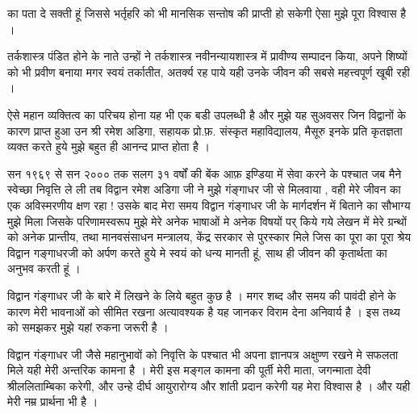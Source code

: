 का पता दे सक्ती हूं जिससे भर्तृहरि को भी मानसिक सन्तोष की प्राप्ती हो सकेगी ऐसा मुझे पूरा विश्वास है । 

तर्कशास्त्र पंडित होने के नाते उन्हों ने तर्कशास्त्र नवीनन्यायशास्त्र में प्रावीण्य सम्पादन किया, अपने शिष्यों को भी प्रवीण बनाया मगर स्वयं तर्कातीत, अतर्क्य रह पाये यही उनके जीवन की सबसे महत्त्वपूर्ण खूबी रही । 

ऐसे महान व्यक्तित्व का परिचय होना यह भी एक बडी उपलब्धी है और मुझे यह सुअवसर जिन विद्वानों के कारण प्राप्त हुआ उन श्री रमेश अडिगा, सहायक प्रो.फ़. संस्कृत महाविद्यालय, मैसूरु इनके प्रति कृतज्ञता व्यक्त करते हुये मुझे बहुत ही आनन्द प्राप्त होता है । 

सन १९६९ से सन २००० तक सलग ३१ वर्षों की बेंक आफ़ इण्डिया में सेवा करने के पश्चात जब मैने स्वेच्छा निवृत्ति ले ली तब विद्वान रमेश अडिगा जी ने मुझे गंङ्गाधर जी से मिलवाया , वही मेरे जीवन का एक अविस्मरणीय क्षण रहा ! उसके बाद मेरा समय विद्वान गंङ्गाधर जी के मार्गदर्शन में बिताने का सौभाग्य मुझे मिला जिसके परिणामस्वरूप मुझे मेरे अनेक भाषाओं मे अनेक विषयों पर् किये गये लेखन में मेरे ग्रन्थों को अनेक प्रान्तीय, तथा मानवसंसाधन मन्त्रालय, केंद्र सरकार से पुरस्कार मिले जिस का पूरा का पूरा श्रेय विद्वान गङ्गाधरजी को अर्पण करते हुये मे स्वयं को धन्य मानती हूं, साथ ही जीवन की कृतार्थता का   अनुभव करती हूं ।

विद्वान गंङ्गाधर जी के बारे में लिखने के लिये बहुत कुछ है ।  मगर शब्द और समय की पावंदी होने के कारण मेरी भावनाओं को सीमित रखना अत्यावश्यक है यह जानकर विराम देना अनिवार्य है । इस तथ्य को समझकर मुझे यहां रुकना जरूरी है । 

विद्वान गंङ्गाधर जी जैसे महानुभावों को निवृत्ति के पश्चात भी अपना ज्ञानपत्र अक्षुण्ण रखने मे सफलता मिले यही मेरी अन्तरिक कामना है । मेरी इस मङ्गल कामना की पूर्ती मेरी माता, जगन्माता देवी श्रीललिताम्बिका करेगी, और उन्हे दीर्घ आयुरारोग्य और शांती प्रदान करेगी यह मेरा विश्वास है । और यही मेरी नम्र प्रार्थना भी है ।
